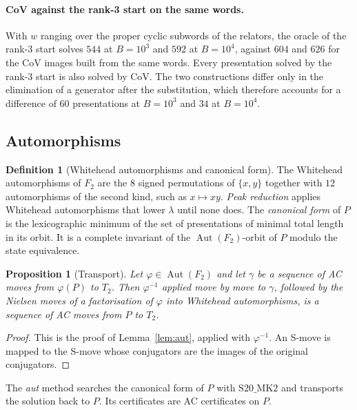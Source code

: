 \documentclass[11pt]{article}
\newtheorem{proposition}[theorem]{Proposition}
\theoremstyle{definition}
\newtheorem{definition}[theorem]{Definition}
\theoremstyle{remark}
\newcommand{\F}{F}
\newcommand{\Aut}{\operatorname{Aut}}
\newcommand{\SMK}{\mathrm{S20\_MK2}}
\begin{document}
\paragraph{CoV against the rank-3 start on the same words.} With $w$ ranging over the proper cyclic subwords of the
relators, the oracle of the rank-3 start solves $544$ at $B=10^3$ and $592$ at $B=10^4$, against $604$ and $626$ for
the CoV images built from the same words. Every presentation solved by the rank-3 start is also solved by CoV. The two
constructions differ only in the elimination of a generator after the substitution, which therefore accounts for a
difference of $60$ presentations at $B=10^3$ and $34$ at $B=10^4$.

\subsection{Automorphisms}

\begin{definition}[Whitehead automorphisms and canonical form]
The Whitehead automorphisms of $\F_2$ are the $8$ signed permutations of $\{x,y\}$ together with $12$ automorphisms of
the second kind, such as $x\mapsto xy$. \emph{Peak reduction} applies Whitehead automorphisms that lower $\lambda$
until none does. The \emph{canonical form} of $P$ is the lexicographic minimum of the set of presentations of minimal
total length in its orbit. It is a complete invariant of the $\Aut(\F_2)$-orbit of $P$ modulo the state equivalence.
\end{definition}

\begin{proposition}[Transport]
Let $\varphi\in\Aut(\F_2)$ and let $\gamma$ be a sequence of AC moves from $\varphi(P)$ to $T_2$. Then $\varphi^{-1}$
applied move by move to $\gamma$, followed by the Nielsen moves of a factorisation of $\varphi$ into Whitehead
automorphisms, is a sequence of AC moves from $P$ to $T_2$.
\end{proposition}

\begin{proof}
This is the proof of Lemma~\ref{lem:aut}, applied with $\varphi^{-1}$. An S-move is mapped to the S-move whose
conjugators are the images of the original conjugators.
\end{proof}

The \emph{aut} method searches the canonical form of $P$ with $\SMK$ and transports the solution back to $P$. Its
certificates are AC certificates on $P$.
\end{document}
